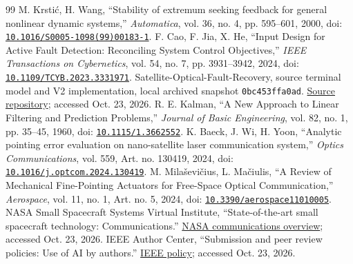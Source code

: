 \begin{thebibliography}{99}
 M. Krstić, H. Wang, ``Stability of extremum seeking feedback for general nonlinear dynamic systems,'' \emph{Automatica}, vol. 36, no. 4, pp. 595--601, 2000, doi: \href{https://doi.org/10.1016/S0005-1098(99)00183-1}{\nolinkurl{10.1016/S0005-1098(99)00183-1}}.
 F. Cao, F. Jia, X. He, ``Input Design for Active Fault Detection: Reconciling System Control Objectives,'' \emph{IEEE Transactions on Cybernetics}, vol. 54, no. 7, pp. 3931--3942, 2024, doi: \href{https://doi.org/10.1109/TCYB.2023.3331971}{\nolinkurl{10.1109/TCYB.2023.3331971}}.
 Satellite-Optical-Fault-Recovery, source terminal model and V2 implementation, local archived snapshot \texttt{0bc453ffa0ad}. \href{https://github.com/kaushalrog/Satellite-Optical-Fault-Recovery}{Source repository}; accessed Oct. 23, 2026.
 R. E. Kalman, ``A New Approach to Linear Filtering and Prediction Problems,'' \emph{Journal of Basic Engineering}, vol. 82, no. 1, pp. 35--45, 1960, doi: \href{https://doi.org/10.1115/1.3662552}{\nolinkurl{10.1115/1.3662552}}.
 K. Baeck, J. Wi, H. Yoon, ``Analytic pointing error evaluation on nano-satellite laser communication system,'' \emph{Optics Communications}, vol. 559, Art. no. 130419, 2024, doi: \href{https://doi.org/10.1016/j.optcom.2024.130419}{\nolinkurl{10.1016/j.optcom.2024.130419}}.
 M. Milaševičius, L. Mačiulis, ``A Review of Mechanical Fine-Pointing Actuators for Free-Space Optical Communication,'' \emph{Aerospace}, vol. 11, no. 1, Art. no. 5, 2024, doi: \href{https://doi.org/10.3390/aerospace11010005}{\nolinkurl{10.3390/aerospace11010005}}.
 NASA Small Spacecraft Systems Virtual Institute, ``State-of-the-art small spacecraft technology: Communications.'' \href{https://www.nasa.gov/smallsat-institute/sst-soa/soa-communications/}{NASA communications overview}; accessed Oct. 23, 2026.
 IEEE Author Center, ``Submission and peer review policies: Use of AI by authors.'' \href{https://journals.ieeeauthorcenter.ieee.org/become-an-ieee-journal-author/publishing-ethics/guidelines-and-policies/submission-and-peer-review-policies/}{IEEE policy}; accessed Oct. 23, 2026.
\end{thebibliography}
